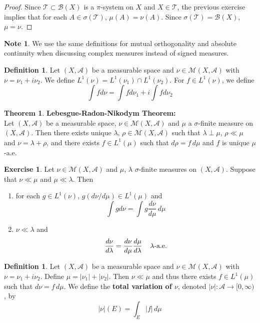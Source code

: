 \documentclass[12pt]{amsart}
\theoremstyle{definition}
\newtheorem{defn}[definition]{Definition}
\newtheorem{note}[definition]{Note}
\newtheorem{thm}[definition]{Theorem}
\newtheorem{ex}[definition]{Exercise}
\newcommand{\lam}{\lambda}
\newcommand{\sig}{\sigma}
\newcommand{\MA}{\mathcal{A}}
\newcommand{\MB}{\mathcal{B}}
\newcommand{\MT}{\mathcal{T}}
\newcommand{\MM}{\mathcal{M}}
\newcommand{\dmu}{\, d \mu}
\newcommand{\Rg}{[0,\infty)}
\newcommand{\lex}[1]{\label{ex:#1}}
\newcommand{\ld}[1]{\label{defn:#1}}
\begin{document}
	\begin{proof}
		Since $\MT \subset \MB(X)$ is a $\pi$-system on $X$ and $X \in \MT$, the previous exercise implies that for each $A \in \sig(\MT)$, $\mu(A) = \nu(A)$. Since $\sig(\MT) = \MB(X)$, $\mu = \nu$. 
	\end{proof}
	
	\begin{note}
		We use the same definitions for mutual orthogonality and absolute continuity when discussing complex measures instead of signed measures.
	\end{note}
	
	\begin{defn} \ld{43003} 
		Let $(X,\MA)$ be a measurable space and $\nu \in \MM(X, \MA)$ with $\nu = \nu_1 + i\nu_2$. We define $L^1(\nu) = L^1(\nu_1)\cap L^1(\nu_2)$. For $f \in L^1(\nu)$, we define $$\int f d\nu = \int fd\nu_1 + i \int f d \nu_2$$
	\end{defn}
	
	\begin{thm}\textbf{Lebesgue-Radon-Nikodym Theorem:}\\
		Let $(X,\MA)$ be a measurable space, $\nu \in \MM(X, \MA)$ and $\mu$ a $\sig$-finite measure on $(X, \MA)$. Then there exists unique $\lam$, $\rho \in \MM(X, \MA)$ such that $\lam \perp \mu$, $\rho \ll \mu$ and $\nu = \lam + \rho$, and there exists $f \in L^1(\mu)$ such that $d\rho = f \dmu$ and $f$ is unique $\mu$-a.e.  
	\end{thm}
	
	\begin{ex} \lex{43003.2}
		Let $\nu \in \MM(X, \MA)$ and $\mu$, $\lam$ $\sig$-finite measures on $(X,\MA)$. Suppose that $\nu \ll \mu$ and $\mu \ll \lam$. Then 
		\begin{enumerate}
			\item for each $g \in L^1(\nu)$, $g(d\nu/d\mu) \in  L^1(\mu)$ and $$\int g d\nu = \int g \frac{d\nu}{d\mu} \dmu$$
			\item $\nu \ll \lam$ and $$\frac{d \nu}{d\lam} = \frac{d \nu}{d\mu} \frac{d\mu}{d\lam} \hspace{4mm} \lam \text{-a.e.}$$
		\end{enumerate}
	\end{ex}
	
	\begin{defn} \ld{43004} 
	Let $(X,\MA)$ be a measurable space and $\nu \in \MM(X,\MA)$ with $ \nu = \nu_1 + i \nu_2$. Define $\mu = |\nu_1| + |\nu_2|$. Then $\nu \ll \mu$ and thus there exists $f \in L^1(\mu)$ such that $d\nu = f \dmu$. We define the \textbf{total variation of $\nu$}, denoted $|\nu|: \MA \rightarrow \Rg$, by $$|\nu|(E) = \int_E |f|\dmu$$ 
	\end{defn}
	
\end{document}
